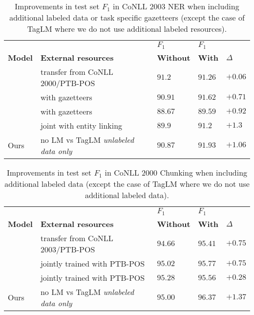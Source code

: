 \documentclass[11pt,a4paper]{article}
\begin{document}
\begin{table*}[t]
\begin{center}
\begin{tabular}{l|p{2.4in}|l|l|l}
\hline \hline
          &                        & $F_1$ & $F_1$ & \\
\bf Model & \bf External resources & \bf Without & \bf With & $\Delta$ \\ \hline
\citet{yang-transfer-iclr07} & transfer from CoNLL 2000/PTB-POS & $91.2$ & $91.26$ & $+0.06$ \\
\citet{chiu-nichols-2016} & with gazetteers & $90.91$ & $91.62$ & $+0.71$ \\
\citet{NLPfromScratch:Collobert2011} & with gazetteers & $88.67$ & $89.59$ & $+0.92$ \\
\citet{luo-EtAl:2015:EMNLP2} & joint with entity linking & $89.9$ & $91.2$ & $\mathbf{+1.3}$ \\
\hline
Ours & no LM vs TagLM \textit{unlabeled data only} & $90.87$ & $\mathbf{91.93}$ & $+1.06$ \\
\hline \hline
\end{tabular}
\end{center}
\caption{\label{2003-table-aux} Improvements in test set $F_1$ in CoNLL 2003 NER when including
additional labeled data or task specific gazetteers (except the case of TagLM where we do not use additional labeled resources).}
\end{table*}



\begin{table*}[t]
\begin{center}
\begin{tabular}{l|p{2.4in}|l|l|l}
\hline \hline
          &                        & $F_1$ & $F_1$ & \\
\bf Model & \bf External resources & \bf Without & \bf With & $\Delta$ \\ \hline
\citet{yang-transfer-iclr07} & transfer from CoNLL 2003/PTB-POS & $94.66$ & $95.41$ & $+0.75$ \\
\citet{joint-many-iclr07} & jointly trained with PTB-POS & $95.02$ & $95.77$ & $+0.75$ \\
\citet{Sgaard2016DeepML} & jointly trained with PTB-POS & $95.28$ & $95.56$ & $+0.28$ \\
\hline
Ours & no LM vs TagLM \textit{unlabeled data only} & $95.00$ & $\mathbf{96.37}$ & $\mathbf{+1.37}$ \\
\hline \hline
\end{tabular}
\end{center}
\caption{\label{2000-table-aux} Improvements in test set $F_1$ in CoNLL 2000 Chunking when including additional labeled data (except the case of TagLM where we do not use additional labeled data).}
\end{table*}
\end{document}
